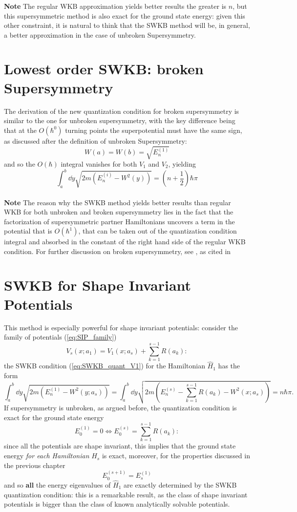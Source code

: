 \textbf{Note} The regular WKB approximation yields better results the
greater is $n$, but this supersymmetric method is also exact for the ground state
energy: given this other constraint, it is natural to think that the SWKB method
will be, in general, a better approximation in the case of unbroken Supersymmetry.

\section{Lowest order SWKB: broken Supersymmetry}
The derivation of the new quantization condition for broken supersymmetry
is similar to the one for unbroken supersymmetry, with the key difference being
that at the $O(\hbar^0)$ turning points the superpotential must have the same
sign, as discussed after the definition of unbroken Supersymmetry:
$$W(a) = W(b) = \sqrt{E_n^{(1)}}$$
and so the $O(\hbar)$ integral vanishes for both $V_1$ and $V_2$, yielding
$$\int_a^b \dd y \sqrt{2m\left(E_n^{(i)}-W^2(y)\right)} = \left(n+\frac{1}{2}
\right)\hbar\pi$$\\

\textbf{Note} The reason why the SWKB method yields better results than regular
WKB for both unbroken and broken supersymmetry lies in the fact that the
factorization of supersymmetric partner Hamiltonians uncovers a term in the
potential that is $O(\hbar^1)$, that can be taken out of the quantization
condition integral and absorbed in the constant of the right hand side of the
regular WKB condition. For further discussion on broken supersymmetry,
see \cite{dutt_ref_in_ref}, as cited in \cite{cooper_main}
\section{SWKB for Shape Invariant Potentials}
This method is especially powerful for shape invariant potentials: consider the
family of potentials (\ref{eq:SIP_family})
$$V_s(x;a_1) = V_1(x;a_s) + \sum_{k=1}^{s-1}R(a_k):$$
the SWKB condition (\ref{eq:SWKB_quant_V1}) for the Hamiltonian $\hat H_1$ has the form
$$\int_{a}^{b}\dd y \sqrt{2m\left(E_n^{(1)}-W^2(y;a_s)\right)} = 
\int_{a}^{b}\dd y \sqrt{2m\left(E_n^{(s)}-\sum_{k=1}^{s-1}R(a_k)-W^2(x;a_s)\right)} = n\hbar\pi.$$
If supersymmetry is unbroken, as argued before, the quantization condition is
exact for the ground state energy
$$E^{(1)}_0 = 0 \iff E^{(s)}_0 = \sum_{k=1}^{s-1}R(a_k):$$
since all the potentials are shape invariant, this implies that the ground state energy \textit{for each
Hamiltonian} $\hat H_s$ is exact, moreover, for the properties discussed in the
previous chapter
$$E^{(s+1)}_0 = E_s^{(1)}$$
and so \textbf{all} the energy eigenvalues of ${\hat H_1}$ are exactly determined by the SWKB
quantization condition: this is a remarkable result, as the class of shape
invariant potentials is bigger than the class of known analytically solvable
potentials.




